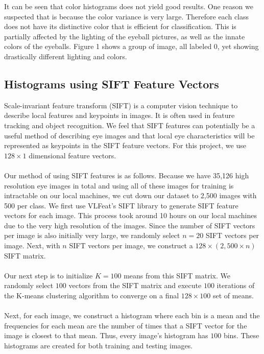 \documentclass{article} %
\begin{document}
It can be seen that color histograms does not yield good results. One reason we suspected that is because the color variance is very large. Therefore each class does not have its distinctive color that is efficient for classification. This is partially affected by the lighting of the eyeball pictures, as well as the innate colors of the eyeballs. Figure 1 shows a group of image, all labeled 0, yet showing drastically different lighting and colors.  

\subsection{Histograms using SIFT Feature Vectors}

Scale-invariant feature transform (SIFT) is a computer vision technique to describe local features and keypoints in images. It is often used in feature tracking and object recognition. We feel that SIFT features can potentially be a useful method of describing eye images and that local eye characteristics will be represented as keypoints in the SIFT feature vectors. For this project, we use $128 \times 1$ dimensional feature vectors.\\ \\
Our method of using SIFT features is as follows. Because we have 35,126 high resolution eye images in total and using all of these images for training is intractable on our local machines, we cut down our dataset to 2,500 images with 500 per class. We first use VLFeat's SIFT library to generate SIFT feature vectors for each image. This process took around 10 hours on our local machines due to the very high resolution of the images. Since the number of SIFT vectors per image is also initially very large, we randomly select $n=20$ SIFT vectors per image. Next, with $n$ SIFT vectors per image, we construct a $128 \times (2,500 \times n)$ SIFT matrix. \\ \\
Our next step is to initialize $K=100$ means from this SIFT matrix. We randomly select $100$ vectors from the SIFT matrix and execute $100$ iterations of the K-means clustering algorithm to converge on a final $128 \times 100$ set of means. \\ \\
Next, for each image, we construct a histogram where each bin is a mean and the frequencies for each mean are the number of times that a SIFT vector for the image is closest to that mean. Thus, every image's histogram has $100$ bins. These histograms are created for both training and testing images.\\ \\
\end{document}
